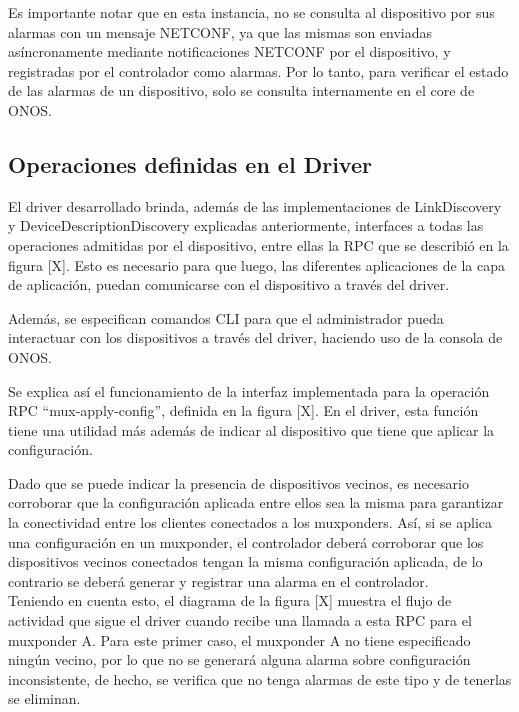   Es importante notar que en esta instancia, no se consulta al dispositivo por sus alarmas con un mensaje NETCONF, ya que las mismas son enviadas asíncronamente mediante notificaciones NETCONF por el dispositivo, y registradas por el controlador como alarmas. Por lo tanto, para verificar el estado de las alarmas de un dispositivo, solo se consulta internamente en el core de ONOS.

  \subsection{Operaciones definidas en el Driver}

  El driver desarrollado brinda, además de las implementaciones de LinkDiscovery y DeviceDescriptionDiscovery explicadas anteriormente, interfaces a todas las operaciones admitidas por el dispositivo, entre ellas la RPC que se describió en la figura [X]. Esto es necesario para que luego, las diferentes aplicaciones de la capa de aplicación, puedan comunicarse con el dispositivo a través del driver. 

  Además, se especifican comandos CLI para que el administrador pueda interactuar con los dispositivos a través del driver, haciendo uso de la consola de ONOS. 

  Se explica así el funcionamiento de la interfaz implementada para la operación RPC “mux-apply-config”, definida en la figura [X]. En el driver, esta función tiene una utilidad más además de indicar al dispositivo que tiene que aplicar la configuración. 

  Dado que se puede indicar la presencia de dispositivos vecinos, es necesario corroborar que la configuración aplicada entre ellos sea la misma para garantizar la conectividad entre los clientes conectados a los muxponders. Así, si se aplica una configuración en un muxponder, el controlador deberá corroborar que los dispositivos vecinos conectados tengan la misma configuración aplicada, de lo contrario se deberá generar y registrar una alarma en el controlador.
  \\

  Teniendo en cuenta esto, el diagrama de la figura [X] muestra el flujo de actividad que sigue el driver cuando recibe una llamada a esta RPC para el muxponder A. Para este primer caso, el muxponder A no tiene especificado ningún vecino, por lo que no se generará alguna alarma sobre configuración inconsistente, de hecho, se verifica que no tenga alarmas de este tipo y de tenerlas se eliminan.

